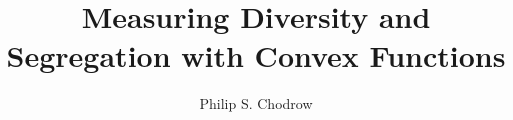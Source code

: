 \documentclass[draft]{scrartcl}
\title{
    Measuring Diversity and Segregation with Convex Functions
}
\author{Philip S. Chodrow}
\begin{document}
\listoftodos


\maketitle






\end{document}
